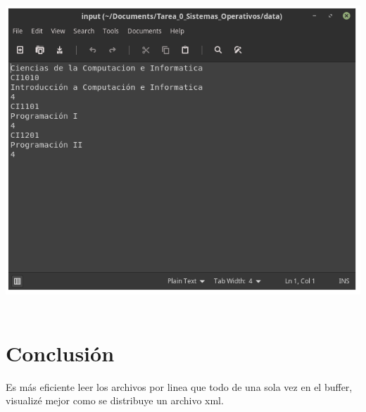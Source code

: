 	 \hfill \includegraphics[scale = 0.4]{pictures/file.png} \hfill \ 

\section{Conclusión}
    Es más eficiente leer los archivos por linea que todo de una sola vez en el buffer, visualizé mejor como se distribuye un archivo xml.

